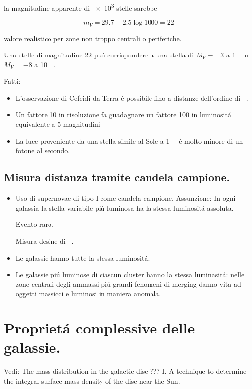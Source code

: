 \documentclass[oneside,12pt,fleqn]{memoir}
\begin{document}
la magnitudine apparente di \num{e3} stelle sarebbe 

\begin{equation*}
m_V=29.7-2.5\log{1000}=22
\end{equation*}

valore realistico per zone non troppo centrali o periferiche.

Una stelle di magnitudine 22 pu\'o corrispondere a una stella di $M_V=-3$ a \SI{1}{\mega\parsec} o $M_V=-8$ a \SI{10}{\mega\parsec}.

Fatti:
\begin{itemize}
    \item L'osservazione di Cefeidi da Terra \'e possibile fino a distanze dell'ordine di \si{\mega\parsec}.
    \item Un fattore 10 in risoluzione fa guadagnare un fattore 100 in luminosit\'a equivalente a 5 magnitudini.
    \item La luce proveniente da una stella simile al Sole a \SI{1}{\mega\parsec} \'e molto minore di un fotone al secondo.
\end{itemize}


\subsection{Misura distanza tramite candela campione.}

\begin{itemize}
    \item Uso di supernovae di tipo I come candela campione. Assunzione: In ogni galassia la stella variabile pi\'u luminosa ha la stessa luminosit\'a assoluta.
    
    Evento raro.
    
    Misura desine di \si{\mega\parsec}.
    \item Le galassie hanno tutte la stessa luminosit\'a.
    \item Le galassie pi\'u luminose di ciascun cluster hanno la stessa luminasit\'a: nelle zone centrali degli ammassi pi\'u grandi fenomeni di merging danno vita ad oggetti massicci e luminosi in maniera anomala.
\end{itemize}

\section{Propriet\'a complessive delle galassie.}
Vedi: The mass distribution in the galactic disc ??? I. A technique to determine the integral surface mass density of the disc near the Sun.
\end{document}
